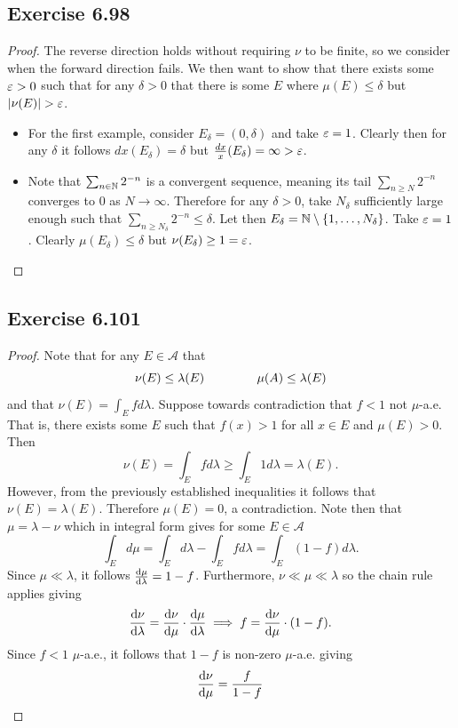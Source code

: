 \documentclass[hw_all.tex]{subfiles}
\begin{document}
\subsection{Exercise 6.98}

\begin{proof}
    The reverse direction holds without requiring $\nu$ to be finite, so we consider when the forward direction fails. We then want to show that there exists some $\varepsilon > 0$ such that for any $\delta > 0$ that there is some $E$ where $\mu(E) \leq \delta$ but $|\nu(E)| > \varepsilon$.
    \begin{itemize}
        \item 
            For the first example, consider $E_{\delta} = (0, \delta)$ and take $\varepsilon = 1$. Clearly then for any $\delta$ it follows $dx(E_{\delta}) = \delta$ but $\frac{dx}{x}(E_{\delta}) = \infty > \varepsilon$.

        \item 
            Note that $\sum_{n \in \mathbb{N}} 2^{-n}$ is a convergent sequence, meaning its tail $\sum_{n \geq N} 2^{-n}$ converges to $0$ as $N \to \infty$. Therefore for any $\delta > 0$, take $N_{\delta}$ sufficiently large enough such that $\sum_{n \geq N_{\delta}} 2^{-n} \leq \delta$. Let then $E_{\delta} = \mathbb{N} \setminus \qty{1, \ldots, N_{\delta}}$. Take $\varepsilon = 1$. Clearly $\mu(E_{\delta}) \leq \delta$ but $\nu(E_{\delta}) \geq 1 = \varepsilon$. \qedhere
    \end{itemize}
\end{proof}

\subsection{Exercise 6.101}

\begin{proof}
    Note that for any $E \in \mathcal{A}$ that
    \[
        \nu(E) \leq \lambda(E) \hspace{1.5cm} \mu(A) \leq \lambda(E)
    \]
    and that $\nu(E) = \int_E f d \lambda$. Suppose towards contradiction that $f < 1$ not $\mu$-a.e. That is, there exists some $E$ such that $f(x) > 1$ for all $x \in E$ and $\mu(E) > 0$. Then
    \[
        \nu(E) = \int_E f d \lambda \geq \int_E 1 d \lambda = \lambda(E)
    .\]
    However, from the previously established inequalities it follows that $\nu(E) = \lambda(E)$. Therefore $\mu(E) = 0$, a contradiction. Note then that $\mu = \lambda - \nu$ which in integral form gives for some $E \in \mathcal{A}$
    \[
        \int_E d \mu = \int_E d \lambda - \int_E f d \lambda = \int_E (1 - f) d \lambda
    .\]
    Since $\mu \ll \lambda$, it follows $\dv{\mu}{\lambda} = 1 - f$. Furthermore, $\nu \ll \mu \ll \lambda$ so the chain rule applies giving
    \[
        \dv{\nu}{\lambda} = \dv{\nu}{\mu} \cdot \dv{\mu}{\lambda} \implies f = \dv{\nu}{\mu} \cdot (1 - f)
    .\]
    Since $f < 1$ $\mu$-a.e., it follows that $1-f$ is non-zero $\mu$-a.e. giving
    \[
        \dv{\nu}{\mu} = \frac{f}{1-f} \qedhere
    \]
\end{proof}
\end{document}
